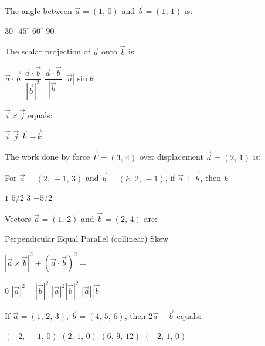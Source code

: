 \documentclass[addpoints]{exam}
\begin{document}
\begin{questions}
\question[1] The angle between $\vec{a} = (1,\, 0)$ and $\vec{b} = (1,\, 1)$ is:
\begin{choices}
    \choice $30^\circ$
    \correctchoice $45^\circ$
    \choice $60^\circ$
    \choice $90^\circ$
\end{choices}

\question[1] The scalar projection of $\vec{a}$ onto $\vec{b}$ is:
\begin{choices}
    \choice $\vec{a} \cdot \vec{b}$
    \choice $\dfrac{\vec{a} \cdot \vec{b}}{|\vec{b}|^2}$
    \correctchoice $\dfrac{\vec{a} \cdot \vec{b}}{|\vec{b}|}$
    \choice $|\vec{a}|\sin\theta$
\end{choices}

\question[1] $\vec{i} \times \vec{j}$ equals:
\begin{choices}
    \choice $\vec{i}$
    \choice $\vec{j}$
    \correctchoice $\vec{k}$
    \choice $-\vec{k}$
\end{choices}

\question[1] The work done by force $\vec{F} = (3,\, 4)$ over displacement $\vec{d} = (2,\, 1)$
is:
\begin{choices}
\end{choices}

\question[1] For $\vec{a} = (2,\, -1,\, 3)$ and $\vec{b} = (k,\, 2,\, -1)$, if
$\vec{a} \perp \vec{b}$, then $k = $
\begin{choices}
    \choice $1$
    \correctchoice $5/2$
    \choice $3$
    \choice $-5/2$
\end{choices}

\question[1] Vectors $\vec{a} = (1,\, 2)$ and $\vec{b} = (2,\, 4)$ are:
\begin{choices}
    \choice Perpendicular
    \choice Equal
    \correctchoice Parallel (collinear)
    \choice Skew
\end{choices}

\question[1] $|\vec{a} \times \vec{b}|^2 + (\vec{a} \cdot \vec{b})^2 = $
\begin{choices}
    \choice $0$
    \choice $|\vec{a}|^2 + |\vec{b}|^2$
    \correctchoice $|\vec{a}|^2|\vec{b}|^2$
    \choice $|\vec{a}||\vec{b}|$
\end{choices}

\question[1] If $\vec{a} = (1,\, 2,\, 3)$, $\vec{b} = (4,\, 5,\, 6)$, then
$2\vec{a} - \vec{b}$ equals:
\begin{choices}
    \correctchoice $(-2,\, -1,\, 0)$
    \choice $(2,\, 1,\, 0)$
    \choice $(6,\, 9,\, 12)$
    \choice $(-2,\, 1,\, 0)$
\end{choices}



\end{questions}
\end{document}
